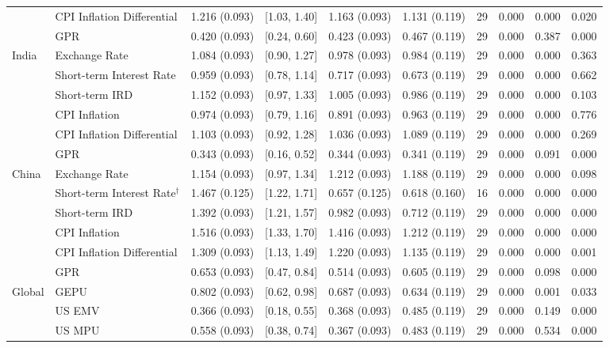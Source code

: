 \begin{table}[!htbp]
\begin{adjustbox}{width=\textwidth}
\begin{tabular}{llcccccccc}
 & CPI Inflation Differential & 1.216 (0.093) & [1.03, 1.40] & 1.163 (0.093) & 1.131 (0.119) & 29 & 0.000 & 0.000 & 0.020 \\
 & GPR & 0.420 (0.093) & [0.24, 0.60] & 0.423 (0.093) & 0.467 (0.119) & 29 & 0.000 & 0.387 & 0.000 \\
\hline
India & Exchange Rate & 1.084 (0.093) & [0.90, 1.27] & 0.978 (0.093) & 0.984 (0.119) & 29 & 0.000 & 0.000 & 0.363 \\
 & Short-term Interest Rate & 0.959 (0.093) & [0.78, 1.14] & 0.717 (0.093) & 0.673 (0.119) & 29 & 0.000 & 0.000 & 0.662 \\
 & Short-term IRD & 1.152 (0.093) & [0.97, 1.33] & 1.005 (0.093) & 0.986 (0.119) & 29 & 0.000 & 0.000 & 0.103 \\
 & CPI Inflation & 0.974 (0.093) & [0.79, 1.16] & 0.891 (0.093) & 0.963 (0.119) & 29 & 0.000 & 0.000 & 0.776 \\
 & CPI Inflation Differential & 1.103 (0.093) & [0.92, 1.28] & 1.036 (0.093) & 1.089 (0.119) & 29 & 0.000 & 0.000 & 0.269 \\
 & GPR & 0.343 (0.093) & [0.16, 0.52] & 0.344 (0.093) & 0.341 (0.119) & 29 & 0.000 & 0.091 & 0.000 \\
\hline
China & Exchange Rate & 1.154 (0.093) & [0.97, 1.34] & 1.212 (0.093) & 1.188 (0.119) & 29 & 0.000 & 0.000 & 0.098 \\
 & Short-term Interest Rate$^{\dagger}$ & 1.467 (0.125) & [1.22, 1.71] & 0.657 (0.125) & 0.618 (0.160) & 16 & 0.000 & 0.000 & 0.000 \\
 & Short-term IRD & 1.392 (0.093) & [1.21, 1.57] & 0.982 (0.093) & 0.712 (0.119) & 29 & 0.000 & 0.000 & 0.000 \\
 & CPI Inflation & 1.516 (0.093) & [1.33, 1.70] & 1.416 (0.093) & 1.212 (0.119) & 29 & 0.000 & 0.000 & 0.000 \\
 & CPI Inflation Differential & 1.309 (0.093) & [1.13, 1.49] & 1.220 (0.093) & 1.135 (0.119) & 29 & 0.000 & 0.000 & 0.001 \\
 & GPR & 0.653 (0.093) & [0.47, 0.84] & 0.514 (0.093) & 0.605 (0.119) & 29 & 0.000 & 0.098 & 0.000 \\
\hline
Global & GEPU & 0.802 (0.093) & [0.62, 0.98] & 0.687 (0.093) & 0.634 (0.119) & 29 & 0.000 & 0.001 & 0.033 \\
 & US EMV & 0.366 (0.093) & [0.18, 0.55] & 0.368 (0.093) & 0.485 (0.119) & 29 & 0.000 & 0.149 & 0.000 \\
 & US MPU & 0.558 (0.093) & [0.38, 0.74] & 0.367 (0.093) & 0.483 (0.119) & 29 & 0.000 & 0.534 & 0.000 \\

\end{tabular}
\end{adjustbox}
\end{table}
